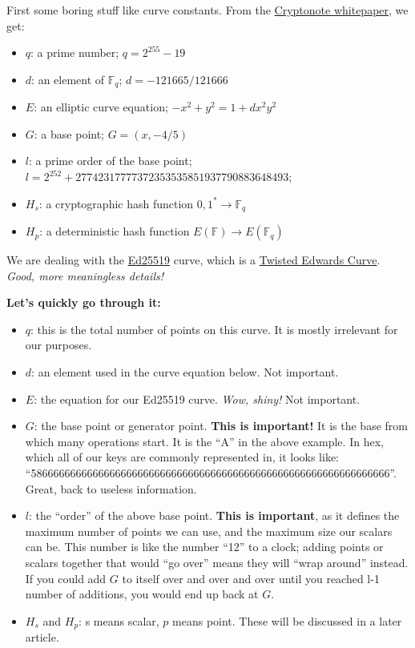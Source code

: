 First some boring stuff like curve constants. From the \href{https://cryptonote.org/whitepaper.pdf}{Cryptonote whitepaper}, we get:
	\begin{itemize}
		\item \(q\): a prime number; \(q=2^{255}-19\)
		\item \(d\): an element of \(\mathbb{F}_q\); \(d=-121665/121666\)
		\item \(E\): an elliptic curve equation; \(-x^2+y^2=1+dx^2y^2\)
		\item \(G\): a base point; \(G=(x,-4/5)\)
		\item \(l\): a prime order of the base point; \(l=2^{252}+27742317777372353535851937790883648493\);
		\item \(H_s\): a cryptographic hash function \({0,1}^*\rightarrow \mathbb{F}_q\)
		\item \(H_p\): a deterministic hash function \(E(\mathbb{F})\rightarrow E(\mathbb{F}_q)\)
	\end{itemize}

We are dealing with the \href{https://en.wikipedia.org/wiki/EdDSA#Ed25519}{Ed25519} curve, which is a \href{https://en.wikipedia.org/wiki/Twisted_Edwards_curve}{Twisted Edwards Curve}. \emph{Good, more meaningless details!}

\textbf{Let's quickly go through it:}
\begin{itemize}
	\item \(q\): this is the total number of points on this curve. It is mostly irrelevant for our purposes.
	\item \(d\): an element used in the curve equation below. Not important.
	\item \(E\): the equation for our Ed25519 curve. \textit{Wow, shiny!} Not important.
	\item \(G\): the base point or generator point. \textbf{This is important!} It is the base from which many operations start. It is the ``A'' in the above example. In hex, which all of our keys are commonly represented in, it looks like: ``5866666666666666666666666666666666666666666666666666666666666666''. Great, back to useless information.
	\item \(l\): the ``order'' of the above base point. \textbf{This is important}, as it defines the maximum number of points we can use, and the maximum size our scalars can be. This number is like the number ``12'' to a clock; adding points or scalars together that would ``go over'' means they will ``wrap around'' instead. If you could add \(G\) to itself over and over and over until you reached l-1 number of additions, you would end up back at \(G\).
	\item \(H_s\) and \(H_p\): s means scalar, \(p\) means point. These will be discussed in a later article.
\end{itemize}

